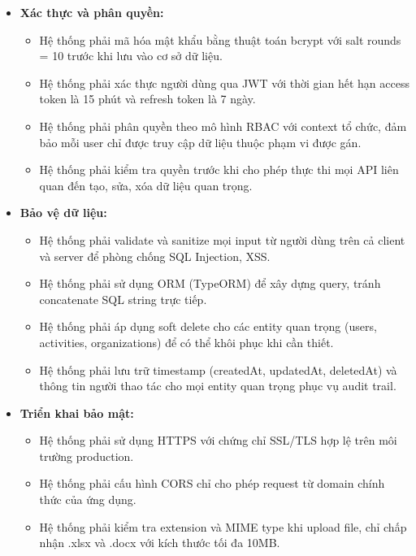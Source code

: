 \begin{itemize}
    \item \textbf{Xác thực và phân quyền:}
    \begin{itemize}
        \item Hệ thống phải mã hóa mật khẩu bằng thuật toán bcrypt với salt rounds = 10 trước khi lưu vào cơ sở dữ liệu.
        \item Hệ thống phải xác thực người dùng qua JWT với thời gian hết hạn access token là 15 phút và refresh token là 7 ngày.
        \item Hệ thống phải phân quyền theo mô hình RBAC với context tổ chức, đảm bảo mỗi user chỉ được truy cập dữ liệu thuộc phạm vi được gán.
        \item Hệ thống phải kiểm tra quyền trước khi cho phép thực thi mọi API liên quan đến tạo, sửa, xóa dữ liệu quan trọng.
    \end{itemize}
    
    \item \textbf{Bảo vệ dữ liệu:}
    \begin{itemize}
        \item Hệ thống phải validate và sanitize mọi input từ người dùng trên cả client và server để phòng chống SQL Injection, XSS.
        \item Hệ thống phải sử dụng ORM (TypeORM) để xây dựng query, tránh concatenate SQL string trực tiếp.
        \item Hệ thống phải áp dụng soft delete cho các entity quan trọng (users, activities, organizations) để có thể khôi phục khi cần thiết.
        \item Hệ thống phải lưu trữ timestamp (createdAt, updatedAt, deletedAt) và thông tin người thao tác cho mọi entity quan trọng phục vụ audit trail.
    \end{itemize}
    
    \item \textbf{Triển khai bảo mật:}
    \begin{itemize}
        \item Hệ thống phải sử dụng HTTPS với chứng chỉ SSL/TLS hợp lệ trên môi trường production.
        \item Hệ thống phải cấu hình CORS chỉ cho phép request từ domain chính thức của ứng dụng.
        \item Hệ thống phải kiểm tra extension và MIME type khi upload file, chỉ chấp nhận .xlsx và .docx với kích thước tối đa 10MB.
    \end{itemize}
\end{itemize}


